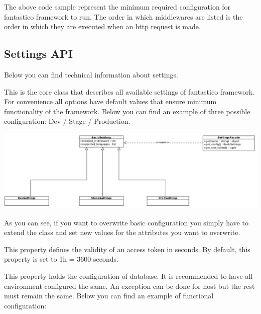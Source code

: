 \documentclass[letterpaper,10pt,english]{sphinxmanual}
\begin{document}
The above code sample represent the minimum required configuration for fantastico framework to run. The order in which middlewares
are listed is the order in which they are executed when an http request is made.


\subsection{Settings API}
\label{get_started/settings:settings-api}
Below you can find technical information about settings.

\begin{fulllineitems}
\label{get_started/settings:fantastico.settings.BasicSettings}
This is the core class that describes all available settings of fantastico framework. For convenience all options
have default values that ensure minimum functionality of the framework. Below you can find an example of three possible
configuration: Dev / Stage / Production.

\includegraphics{settings.png}

As you can see, if you want to overwrite basic configuration you simply have to extend the class and set new values
for the attributes you want to overwrite.

\begin{fulllineitems}
\label{get_started/settings:fantastico.settings.BasicSettings.access_token_validity}
This property defines the validity of an access token in seconds. By default, this property is set
to 1h = 3600 seconds.

\end{fulllineitems}


\begin{fulllineitems}
\label{get_started/settings:fantastico.settings.BasicSettings.database_config}
This property holds the configuration of database. It is recommended to have all environment configured the same.
An exception can be done for host but the rest must remain the same. Below you can find an example of functional
configuration:


\end{fulllineitems}
\end{fulllineitems}
\end{document}
